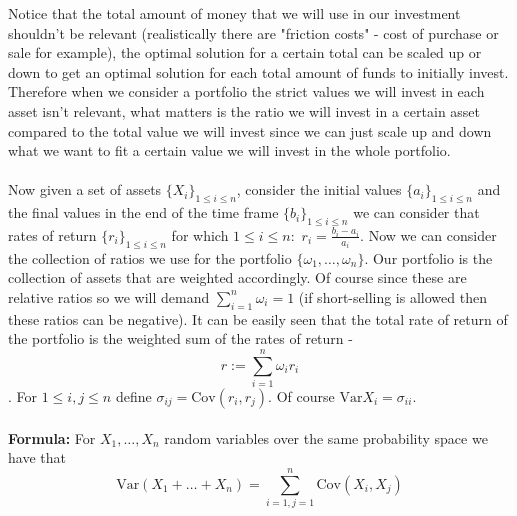 \documentclass{article}
\begin{document}
Notice that the total amount of money that we will use in our investment shouldn't be relevant (realistically there are "friction costs" - cost of purchase or sale for example), the optimal solution for a certain total can be scaled up or down to get an optimal solution for each total amount of funds to initially invest. Therefore when we consider a portfolio the strict values we will invest in each asset isn't relevant, what matters is the ratio we will invest in a certain asset compared to the total value we will invest since we can just scale up and down what we want to fit a certain value we will invest in the whole portfolio. \\\\
Now given a set of assets $\{X_i\}_{1\leq i\leq n}$, consider the initial values $\{a_i\}_{1\leq i\leq n}$ and the final values in the end of the time frame $\{b_i\}_{1\leq i\leq n}$ we can consider that rates of return $\{r_i\}_{1\leq i\leq n}$ for which $1\leq i\leq n:$ $r_i=\frac{b_i-a_i}{a_i}$. Now we can consider the collection of ratios we use for the portfolio $\{\omega_1,\dots,\omega_n\}$. Our portfolio is the collection of assets that are weighted accordingly. Of course since these are relative ratios so we will demand $\sum_{i=1}^n \omega_i = 1$ (if short-selling is allowed then these ratios can be negative). It can be easily seen that the total rate of return of the portfolio is the weighted sum of the rates of return - \[r:=\sum_{i=1}^n \omega_i r_i\]. For $1\leq i,j\leq n$ define $\sigma_{ij}=\text{Cov}(r_i,r_j)$. Of course $\text{Var}{X_i}=\sigma_{ii}$. \\\\
\textbf{Formula:} For $X_1,\dots,X_n$ random variables over the same probability space we have that \[\text{Var}(X_1+\dots+X_n) = \sum_{i=1, j=1}^n \text{Cov}(X_i,X_j)\]
\end{document}

